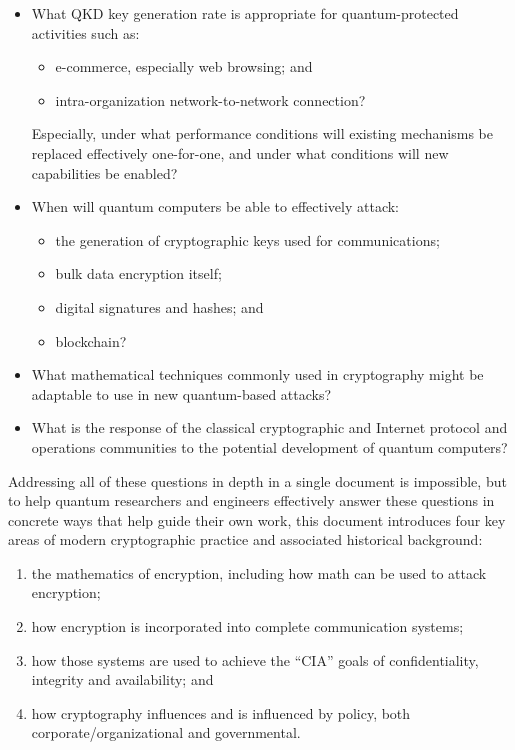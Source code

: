 \documentclass[%
 aip,
 jmp,%
 amsmath,amssymb,
 reprint,%
]{revtex4-1}
\begin{document}
\begin{itemize}
\item What QKD key generation rate is appropriate for
  quantum-protected activities such as:
  \begin{itemize}
  \item e-commerce, especially web browsing; and
  \item intra-organization network-to-network connection?
  \end{itemize}
  Especially, under what performance conditions will existing mechanisms
  be replaced effectively one-for-one, and under what conditions will new
  capabilities be enabled?
\item When will quantum computers be able to effectively attack:
  \begin{itemize}
  \item the generation of cryptographic keys used for communications;
  \item bulk data encryption itself;
  \item digital signatures and hashes; and
  \item blockchain?
  \end{itemize}
\item What mathematical techniques commonly used in cryptography might
  be adaptable to use in new quantum-based attacks?
\item What is the response of the classical cryptographic and Internet
  protocol and operations communities to the potential development of
  quantum computers?
\end{itemize}

Addressing all of these questions in depth in a single document is
impossible, but to help quantum researchers and engineers effectively
answer these questions in concrete ways that help guide their own
work, this document introduces four key areas of modern cryptographic
practice and associated historical background:

\begin{enumerate}
\item the mathematics of encryption, including how math can be used to
  attack encryption;
\item how encryption is incorporated into complete communication
  systems;
\item how those systems are used to achieve the ``CIA'' goals of
  confidentiality, integrity and availability; and
\item how cryptography influences and is influenced by policy, both
  corporate/organizational and governmental.
\end{enumerate}
\end{document}
